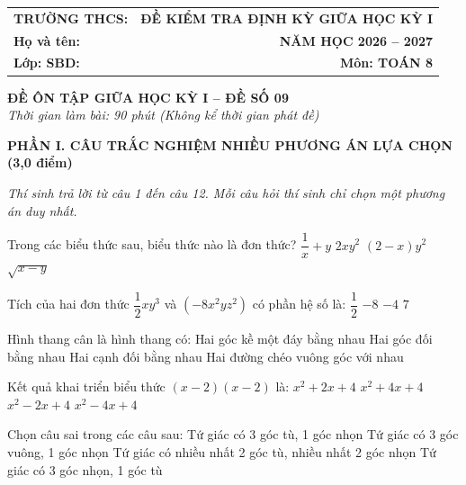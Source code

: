 \documentclass[12pt,a4paper]{article}
\begin{document}
\noindent
\begin{tabularx}{\linewidth}{X r}
\textbf{TRƯỜNG THCS: \dotfill} & \textbf{ĐỀ KIỂM TRA ĐỊNH KỲ GIỮA HỌC KỲ I} \\
\textbf{Họ và tên: \dotfill} & \textbf{NĂM HỌC 2026 -- 2027} \\
\textbf{Lớp: \dotfill \quad SBD: \dotfill} & \textbf{Môn: TOÁN 8} \\
\hline
\end{tabularx}
\vspace{2mm}

\begin{center}
  \textbf{\large ĐỀ ÔN TẬP GIỮA HỌC KỲ I -- ĐỀ SỐ 09}\\
  \textit{Thời gian làm bài: 90 phút (Không kể thời gian phát đề)}
\end{center}
\vspace{1mm}

\noindent\textbf{\large PHẦN I. CÂU TRẮC NGHIỆM NHIỀU PHƯƠNG ÁN LỰA CHỌN (3,0 điểm)}

\textit{Thí sinh trả lời từ câu 1 đến câu 12. Mỗi câu hỏi thí sinh chỉ chọn một phương án duy nhất.}

\vspace{1mm}
\begin{ex}
Trong các biểu thức sau, biểu thức nào là đơn thức?
\choice
{$\dfrac{1}{x} + y$}
{\True $2xy^2$}
{$(2 - x)y^2$}
{$\sqrt{x - y}$}
\end{ex}

\begin{ex}
Tích của hai đơn thức $\dfrac{1}{2}xy^3$ và $(-8x^2yz^2)$ có phần hệ số là:
\choice
{$\dfrac{1}{2}$}
{$-8$}
{\True $-4$}
{$7$}
\end{ex}

\begin{ex}
Hình thang cân là hình thang có:
\choice
{\True Hai góc kề một đáy bằng nhau}
{Hai góc đối bằng nhau}
{Hai cạnh đối bằng nhau}
{Hai đường chéo vuông góc với nhau}
\end{ex}

\begin{ex}
Kết quả khai triển biểu thức $(x - 2)(x - 2)$ là:
\choice
{$x^2 + 2x + 4$}
{$x^2 + 4x + 4$}
{$x^2 - 2x + 4$}
{\True $x^2 - 4x + 4$}
\end{ex}

\begin{ex}
Chọn câu sai trong các câu sau:
\choice
{Tứ giác có 3 góc tù, 1 góc nhọn}
{\True Tứ giác có 3 góc vuông, 1 góc nhọn}
{Tứ giác có nhiều nhất 2 góc tù, nhiều nhất 2 góc nhọn}
{Tứ giác có 3 góc nhọn, 1 góc tù}
\end{ex}
\end{document}
